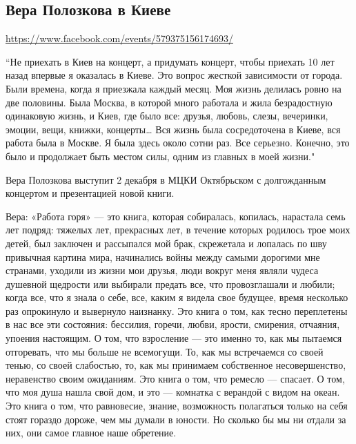  
 

\subsection{Вера Полозкова в Киеве}
\label{sec:27_10_2020.fb.ads.1.vera_polozkova}

\url{https://www.facebook.com/events/579375156174693/}

“Не приехать в Киев на концерт, а придумать концерт, чтобы приехать 10 лет
назад впервые я оказалась в Киеве. Это вопрос жесткой зависимости от города.
Были времена, когда я приезжала каждый месяц. Моя жизнь делилась ровно на две
половины. Была Москва, в которой много работала и жила безрадостную одинаковую
жизнь, и Киев, где было все: друзья, любовь, слезы, вечеринки, эмоции, вещи,
книжки, концерты… Вся жизнь была сосредоточена в Киеве, вся работа была в
Москве. Я была здесь около сотни раз. Все серьезно. Конечно, это было и
продолжает быть местом силы, одним из главных в моей жизни."

Вера Полозкова выступит 2 декабря в МЦКИ Октябрьском с долгожданным концертом и презентацией новой книги.

Вера: «Работа горя» --- это книга, которая собиралась, копилась, нарастала семь
лет подряд: тяжелых лет, прекрасных лет, в течение которых родилось трое моих
детей, был заключен и рассыпался мой брак, скрежетала и лопалась по шву
привычная картина мира, начинались войны между самыми дорогими мне странами,
уходили из жизни мои друзья, люди вокруг меня являли чудеса душевной щедрости
или выбирали предать все, что провозглашали и любили; когда все, что я знала о
себе, все, каким я видела свое будущее, время несколько раз опрокинуло и
вывернуло наизнанку. Это книга о том, как тесно переплетены в нас все эти
состояния: бессилия, горечи, любви, ярости, смирения, отчаяния, упоения
настоящим. О том, что взросление --- это именно то, как мы пытаемся отгоревать,
что мы больше не всемогущи. То, как мы встречаемся со своей тенью, со своей
слабостью, то, как мы принимаем собственное несовершенство, неравенство своим
ожиданиям. Это книга о том, что ремесло --- спасает. О том, что моя душа нашла
свой дом, и это --- комнатка с верандой с видом на океан. Это книга о том, что
равновесие, знание, возможность полагаться только на себя стоят гораздо дороже,
чем мы думали в юности. Но сколько бы мы ни отдали за них, они самое главное
наше обретение.

